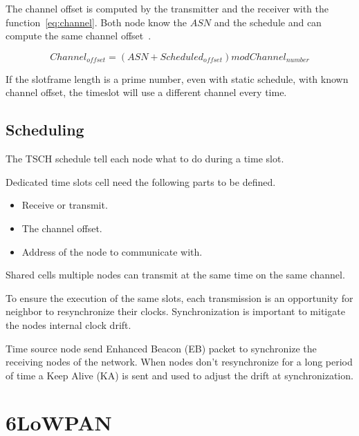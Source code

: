 
The channel offset is computed by the transmitter and the receiver with the
function~\ref{eq:channel}. Both node know the $ASN$ and the schedule and can
compute the same channel offset~\cite{rfc7554}.

\begin{equation}
  \label{eq:channel}
  Channel_{offset} = (ASN + Scheduled_{offset}) mod Channel_{number}
\end{equation}

If the slotframe length is a prime number, even with static schedule,
with known channel offset, the timeslot will use a different channel every time.

\subsection{Scheduling}

The TSCH schedule tell each node what to do during a time slot.

Dedicated time slots cell need the following parts to be defined.

\begin{itemize}
  \item Receive or transmit.
  \item The channel offset.
  \item Address of the node to communicate with.
\end{itemize}

Shared cells multiple nodes can transmit at the same time on the same channel.

To ensure the execution of the same slots, each transmission is an opportunity 
for neighbor to resynchronize their clocks.
Synchronization is important to mitigate the nodes internal clock drift.

Time source node send Enhanced Beacon (EB) packet to synchronize the receiving
nodes of the network. When nodes don't resynchronize for a long period of time 
a Keep Alive (KA) is sent and used to adjust the drift at synchronization.


\section{6LoWPAN}


